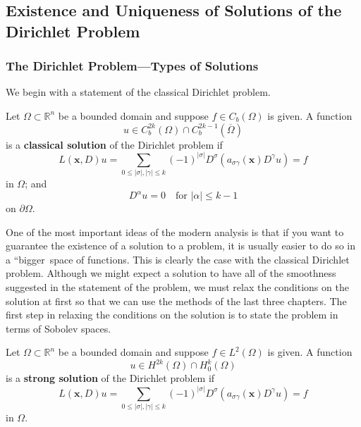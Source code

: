 \subsection{Existence and Uniqueness of Solutions of the Dirichlet Problem}\label{sec:dirichlet-existence-and-uniqueness}

\subsubsection{The Dirichlet Problem---Types of Solutions}\label{subsec:dirichlet-types-of-solutions}

We begin with a statement of the classical Dirichlet problem.

\begin{Definition}
\label{def:classical-dirichlet-solution}
Let $\Omega\subset\mathbb{R}^n$ be a bounded domain and suppose $f\in C_b(\Omega)$ is given. A function\[u\in C_b^{2k}(\Omega)\cap C_b^{2k-1}(\overline\Omega)\]is a \textbf{classical solution} of the Dirichlet problem if
\begin{equation}\label{eq:classical-dirichlet-divergence-equation}
L(\bm{x},D)u=\sum_{0\leq|\sigma|,|\gamma|\leq k}(-1)^{|\sigma|}D^\sigma(a_{\sigma\gamma}(\bm{x})D^\gamma u)=f
\end{equation}
in $\Omega$; and
\begin{equation}\label{eq:classical-dirichlet-homogeneous-boundary-conditions}
D^\alpha u=0\quad\text{for }|\alpha|\leq k-1
\end{equation}
on $\partial\Omega$.
\end{Definition}

One of the most important ideas of the modern analysis is that if you want to guarantee the existence of a solution to a problem, it is usually easier to do so in a ``bigger\textquotesingle\textquotesingle\ space of functions. This is clearly the case with the classical Dirichlet problem. Although we might expect a solution to have all of the smoothness suggested in the statement of the problem, we must relax the conditions on the solution at first so that we can use the methods of the last three chapters. The first step in relaxing the conditions on the solution is to state the problem in terms of Sobolev spaces.

\begin{Definition}
\label{def:strong-dirichlet-solution}
Let $\Omega\subset\mathbb{R}^n$ be a bounded domain and suppose $f\in L^2(\Omega)$ is given. A function\[u\in H^{2k}(\Omega)\cap H_0^k(\Omega)\]is a \textbf{strong solution} of the Dirichlet problem if
\begin{equation}\label{eq:strong-dirichlet-divergence-equation}
L(\bm{x},D)u=\sum_{0\leq|\sigma|,|\gamma|\leq k}(-1)^{|\sigma|}D^\sigma(a_{\sigma\gamma}(\bm{x})D^\gamma u)=f
\end{equation}
in $\Omega$.
\end{Definition}

